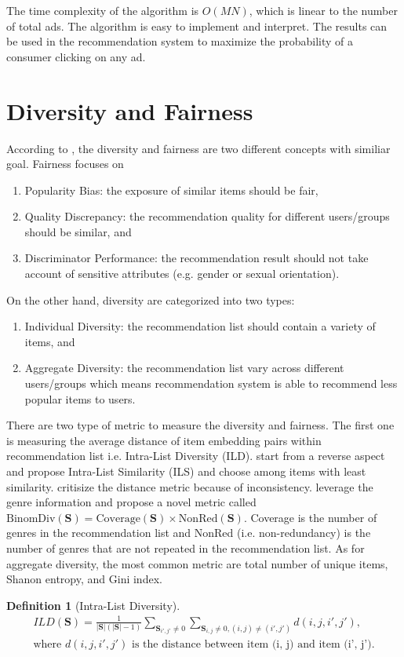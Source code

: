 \documentclass[12pt]{article}
\theoremstyle{definition}
\newtheorem{definition}{Definition}[section]
\newcommand{\matr}[1]{\mathbf{#1}} %
\begin{document}
\begin{sloppypar}
The time complexity of the algorithm is $O(MN)$, which is linear to the number of total ads. The algorithm is easy to implement and interpret. The results can be used in the recommendation system to maximize the probability of a consumer clicking on any ad.

\section{Diversity and Fairness}
According to \textcite{zhao2024}, the diversity and fairness are two different concepts with similiar goal. Fairness focuses on 
\begin{enumerate}
    \item Popularity Bias: the exposure of similar items should be fair,
    \item Quality Discrepancy: the recommendation quality for different users/groups should be similar, and
    \item Discriminator Performance: the recommendation result should not take account of sensitive attributes (e.g. gender or sexual orientation). 
\end{enumerate}
On the other hand, diversity are categorized into two types:
\begin{enumerate}
    \item Individual Diversity: the recommendation list should contain a variety of items, and
    \item Aggregate Diversity: the recommendation list vary across different users/groups which means recommendation system is able to recommend less popular items to users. 
\end{enumerate}

There are two type of metric to measure the diversity and fairness. The first one is measuring the average distance of item embedding pairs within recommendation list i.e. Intra-List Diversity (ILD). \textcite{10.1145/1060745.1060754} start from a reverse aspect and propose Intra-List Similarity (ILS) and choose among items with least similarity. \textcite{10.1145/2645710.2645743} critisize the distance metric because of inconsistency. \textcite{10.1145/2645710.2645743} leverage the genre information and propose a novel metric called $\mathrm{BinomDiv(\matr{S})} = \mathrm{Coverage(\matr{S})}\times\mathrm{NonRed(\matr{S})}$. Coverage is the number of genres in the recommendation list and NonRed (i.e. non-redundancy) is the number of genres that are not repeated in the recommendation list. As for aggregate diversity, the most common metric are total number of unique items, Shanon entropy, and Gini index.
\begin{definition}[Intra-List Diversity]
    \begin{align*}
        ILD(\matr{S}) = \frac{1}{|\matr{S}|(|\matr{S}|-1)}\sum_{\matr{S}_{i',j'}\neq 0}\sum_{\matr{S}_{i,j}\neq 0, (i,j)\neq(i',j')}d(i, j, i', j'), \\
        \text{where $d(i, j, i', j')$ is the distance between item (i, j) and item (i', j').}
    \end{align*}
\end{definition}


\end{sloppypar}
\end{document}
